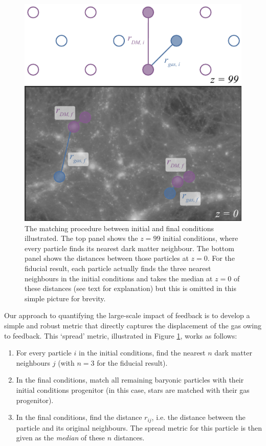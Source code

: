 \begin{figure}
    \centering
    \includegraphics[width=\columnwidth]{figures/kspafig_small.pdf}
    \vspace{-0.5cm}
    \caption{The matching procedure between initial and final conditions
    illustrated. The top panel shows the $z=99$ initial conditions, where
    every particle finds its nearest dark matter neighbour. The bottom
    panel shows the distances between those particles at $z=0$. For the
    fiducial result, each particle actually finds the three nearest 
    neighbours in the initial conditions and takes the median at $z=0$
    of these distances (see text for explanation) but this is omitted
    in this simple picture for brevity.}
    \vspace{-0.5cm}
    \label{fig:kspafigsmall}
\end{figure}

Our approach to quantifying the large-scale impact of feedback is to develop
a simple and robust metric that directly captures the displacement of the gas
owing to feedback. This `spread' metric, illustrated in Figure
\ref{fig:kspafigsmall}, works as follows:

\begin{enumerate} 
	\item For every particle $i$ in the initial conditions, find the nearest
          $n$ dark matter neighbours $j$ (with $n=3$ for the fiducial result).
	\item In the final conditions, match all remaining baryonic particles
	      with their initial conditions progenitor (in this case, stars are
	      matched with their gas progenitor).
	\item In the final conditions, find the distance $r_{ij}$, i.e. the
	      distance between the particle and its original neighbours. The spread metric for
	      this particle is then given as the \emph{median} of these $n$
	      distances.
\end{enumerate}

